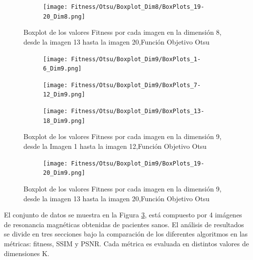 \documentclass[conference]{IEEEtran}
\begin{document}
\begin{figure}
    \centering
    \begin{subfigure}{0.5\textwidth}
        \texttt{[image: Fitness/Otsu/Boxplot\_Dim8/BoxPlots\_19-20\_Dim8.png]}
        \vspace{-150pt} %
    \end{subfigure}
    \caption{Boxplot de los valores Fitness por cada imagen en la dimensión 8, desde la imagen 13 hasta la imagen 20,Función Objetivo Otsu}
    \label{fig:imagenes}    
\end{figure}
\begin{figure}
    \centering

    \begin{subfigure}{0.5\textwidth}
        \texttt{[image: Fitness/Otsu/Boxplot\_Dim9/BoxPlots\_1-6\_Dim9.png]}
    \end{subfigure}
    
    \begin{subfigure}{0.5\textwidth}
        \texttt{[image: Fitness/Otsu/Boxplot\_Dim9/BoxPlots\_7-12\_Dim9.png]}
    \end{subfigure}
         \begin{subfigure}{0.5\textwidth}
        \texttt{[image: Fitness/Otsu/Boxplot\_Dim9/BoxPlots\_13-18\_Dim9.png]}
    \end{subfigure}
    \caption{Boxplot de los valores Fitness por cada imagen en la dimensión 9, desde la Imagen 1 hasta la imagen 12,Función Objetivo Otsu}
\label{fig:imagenes}    
\end{figure}

\begin{figure}
    \centering
    \begin{subfigure}{0.5\textwidth}
        \texttt{[image: Fitness/Otsu/Boxplot\_Dim9/BoxPlots\_19-20\_Dim9.png]}
        \vspace{-150pt} %
    \end{subfigure}
    \caption{Boxplot de los valores Fitness por cada imagen en la dimensión 9, desde la imagen 13 hasta la imagen 20,Función Objetivo Otsu}
    \label{fig:imagenes}    
\end{figure}





\noindent El conjunto de datos se muestra en la Figura \ref{fig:imagenes}, está compuesto por 4 imágenes de resonancia magnéticas obtenidas de pacientes sanos. 
El análisis de resultados se divide en tres secciones bajo la comparación de los diferentes algoritmos en las métricas: fitness, SSIM y PSNR. Cada métrica es evaluada en distintos valores de dimensiones K.
\end{document}

